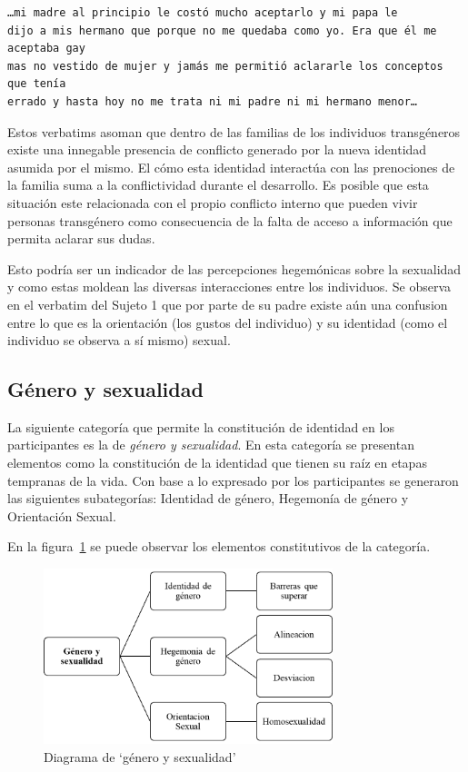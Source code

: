 \begin{verbatim}
…mi madre al principio le costó mucho aceptarlo y mi papa le
dijo a mis hermano que porque no me quedaba como yo. Era que él me aceptaba gay
mas no vestido de mujer y jamás me permitió aclararle los conceptos que tenía
errado y hasta hoy no me trata ni mi padre ni mi hermano menor…
\end{verbatim}

Estos verbatims asoman que dentro de las familias de los individuos transgéneros
existe una innegable presencia de conflicto generado por la nueva identidad
asumida por el mismo. El cómo esta identidad interactúa con las prenociones de
la familia suma a la conflictividad durante el desarrollo. Es posible que esta
situación este relacionada con el propio conflicto interno que pueden vivir
personas transgénero como consecuencia de la falta de acceso a información que
permita aclarar sus dudas.

Esto podría ser un indicador de las percepciones hegemónicas sobre la sexualidad
y como estas moldean las diversas interacciones entre los individuos. Se
observa en el verbatim del Sujeto 1 que por parte de su padre existe aún una
confusion entre lo que es la orientación (los gustos del individuo) y su
identidad (como el individuo se observa a sí mismo) sexual.

\subsection{Género y sexualidad}

La siguiente categoría que permite la constitución de identidad en los
participantes es la de \emph{género y sexualidad}. En esta categoría se
presentan elementos como la constitución de la identidad que tienen su raíz en
etapas tempranas de la vida. Con base a lo expresado por los participantes se
generaron las siguientes subategorías: Identidad de género, Hegemonía de género
y Orientación Sexual.

En la figura~\ref{fig:genero} se puede observar los elementos constitutivos de
la categoría.

\begin{figure}
    \centering
    \includegraphics[width=0.75\textwidth]{genero}
    \caption{Diagrama de ‘género y sexualidad’}\label{fig:genero}
\end{figure}

